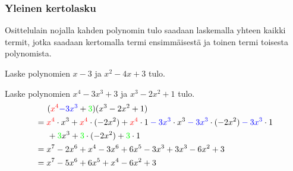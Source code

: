 \subsubsection*{Yleinen kertolasku}

Osittelulain nojalla kahden polynomin tulo saadaan laskemalla yhteen kaikki
termit, jotka saadaan kertomalla termi ensimmäisestä ja toinen termi toisesta
polynomista.



\begin{esimerkki}
Laske polynomien $x-3$ ja $x^2-4x+3$ tulo. \\
\newline
\end{esimerkki}

\begin{esimerkki}
Laske polynomien $x^4-3x^3+3$ ja $x^3-2x^2+1$ tulo. \\
\begin{align*}
&\hspace{0.5cm}(\textcolor{red}{x^4} \textcolor{blue}{-3x^3} +{}\textcolor{green}{3})(x^3-2x^2+1) \\
&= \textcolor{red}{x^4}\cdot x^3 + \textcolor{red}{x^4}\cdot (-2x^2)+\textcolor{red}{x^4}\cdot 1\textcolor{blue}{{}-3x^3}\cdot x^3\textcolor{blue}{{}-3x^3}\cdot(-2x^2)\textcolor{blue}{{}-3x^3}\cdot1 \\
&\hspace{0.5cm}+\textcolor{green}{3}x^3+\textcolor{green}{3}\cdot(-2x^2)+\textcolor{green}{3}\cdot 1 \\
&= x^7-2x^6+x^4-3x^6+6x^5-3x^3+3x^3-6x^2+3 \\
&= x^7-5x^6+6x^5+x^4-6x^2+3
\end{align*}
\end{esimerkki}

